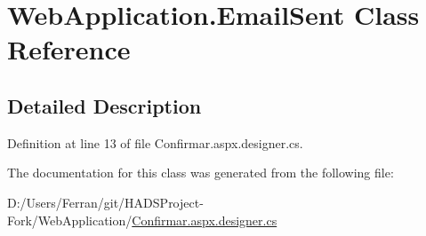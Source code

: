 \hypertarget{classWebApplication_1_1EmailSent}{}\section{Web\+Application.\+Email\+Sent Class Reference}
\label{classWebApplication_1_1EmailSent}


\subsection{Detailed Description}


Definition at line 13 of file Confirmar.\+aspx.\+designer.\+cs.



The documentation for this class was generated from the following file\+:\begin{DoxyCompactItemize}
\item 
D\+:/\+Users/\+Ferran/git/\+H\+A\+D\+S\+Project-\/\+Fork/\+Web\+Application/\mbox{\hyperlink{Confirmar_8aspx_8designer_8cs}{Confirmar.\+aspx.\+designer.\+cs}}\end{DoxyCompactItemize}
